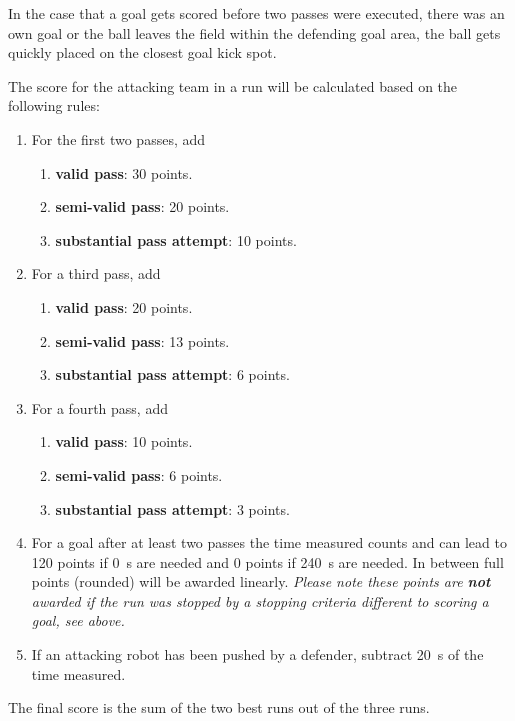 In the case that a goal gets scored before two passes were executed, there was an own goal or the ball leaves the field within the defending goal area, the ball gets quickly placed on the closest goal kick spot.

The score for the attacking team in a run will be calculated based on the following rules:

\begin{enumerate}
	\item For the first two passes, add 
	\begin{enumerate}
		\item \textbf{valid pass}: \qty{30}{} points.
		\item \textbf{semi-valid pass}: \qty{20}{} points.
		\item \textbf{substantial pass attempt}: \qty{10}{} points.
	\end{enumerate}
	\item For a third pass, add
	\begin{enumerate}
		\item \textbf{valid pass}: \qty{20}{} points.
		\item \textbf{semi-valid pass}: \qty{13}{} points.
		\item \textbf{substantial pass attempt}: \qty{6}{} points.
	\end{enumerate}
	\item For a fourth pass, add
	\begin{enumerate}
		\item \textbf{valid pass}: \qty{10}{} points.
		\item \textbf{semi-valid pass}: \qty{6}{} points.
		\item \textbf{substantial pass attempt}: \qty{3}{} points.
	\end{enumerate}
	\item For a goal after at least two passes the time measured counts and can lead to \qty{120}{} points if \qty{0}{\second} are needed and \qty{0}{} points if \qty{240}{\second} are needed. In between full points (rounded) will be awarded linearly. \textit{Please note these points are \textbf{not} awarded if the run was stopped by a stopping criteria different to scoring a goal, see above.}
	\item If an attacking robot has been pushed by a defender, subtract \qty{20}{\second} of the time measured.
\end{enumerate}

The final score is the sum of the two best runs out of the three runs.

